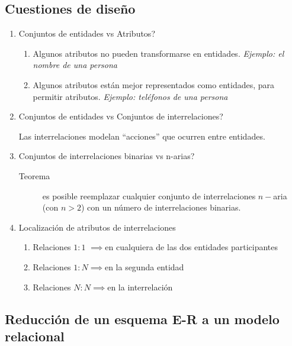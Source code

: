 \documentclass[a4paper, twoside]{article}
\begin{document}
\subsection{Cuestiones de diseño}
\begin{enumerate}
\item Conjuntos de entidades vs Atributos?

\begin{enumerate}
\item Algunos atributos no pueden transformarse en entidades. \emph{Ejemplo:
el nombre de una persona}
\item Algunos atributos están mejor representados como entidades, para permitir
atributos. \emph{Ejemplo: teléfonos de una persona}
\end{enumerate}
\item Conjuntos de entidades vs Conjuntos de interrelaciones?


Las interrelaciones modelan ``acciones'' que ocurren entre entidades.

\item Conjuntos de interrelaciones binarias vs n-arias?

\begin{description}
\item [{Teorema}] es posible reemplazar cualquier conjunto de interrelaciones
$n-$aria (con $n>2$) con un número de interrelaciones binarias.
\end{description}
\item Localización de atributos de interrelaciones

\begin{enumerate}
\item Relaciones $1:1$ $\implies$en cualquiera de las dos entidades participantes
\item Relaciones $1:N$$\implies$en la segunda entidad
\item Relaciones $N:N$$\implies$en la interrelación
\end{enumerate}
\end{enumerate}

\subsection{Reducción de un esquema E-R a un modelo relacional}
\end{document}
